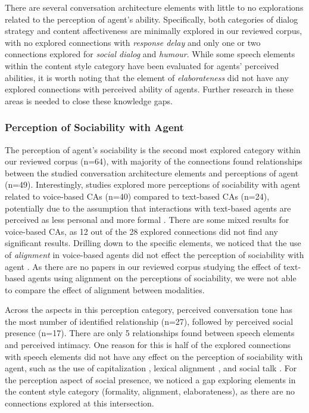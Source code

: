 There are several conversation architecture elements with little to no explorations related to the perception of agent's ability. Specifically, both categories of dialog strategy and content affectiveness are minimally explored in our reviewed corpus, with no explored connections with \textit{response delay} and only one or two connections explored for \textit{social dialog} and \textit{humour}. While some speech elements within the content style category have been evaluated for agents' perceived abilities, it is worth noting that the element of \textit{elaborateness} did not have any explored connections with perceived ability of agents. Further research in these areas is needed to close these knowledge gaps. 


\subsubsection{Perception of Sociability with Agent}

The perception of agent's sociability is the second most explored category within our reviewed corpus (n=64), with majority of the connections found relationships between the studied conversation architecture elements and perceptions of agent (n=49). Interestingly, studies explored more perceptions of sociability with agent related to voice-based CAs (n=40) compared to text-based CAs (n=24), potentially due to the assumption that interactions with text-based agents are perceived as less personal and more formal \cite{kocielnik2018designing}. There are some mixed results for voice-based CAs, as 12 out of the 28 explored connections did not find any significant results. Drilling down to the specific elements, we noticed that the use of \textit{alignment} in voice-based agents did not effect the perception of sociability with agent \cite{healey2013relating, linnemann2018can}\cmt{[39][15]}. As there are no papers in our reviewed corpus studying the effect of text-based agents using alignment on the perceptions of sociability, we were not able to compare the effect of alignment between modalities.

Across the aspects in this perception category, perceived conversation tone has the most number of identified relationship (n=27), followed by perceived social presence (n=17). There are only 5 relationships found between speech elements and perceived intimacy. One reason for this is half of the explored connections with speech elements did not have any effect on the perception of sociability with agent, such as the use of capitalization \cite{westerman2019believe}\cmt{[9]}, lexical alignment \cite{linnemann2018can}\cmt{[15]}, and social talk \cite{lubold2016effects}\cmt{[86]}. For the perception aspect of social presence, we noticed a gap exploring elements in the content style category (formality, alignment, elaborateness), as there are no connections explored at this intersection.

